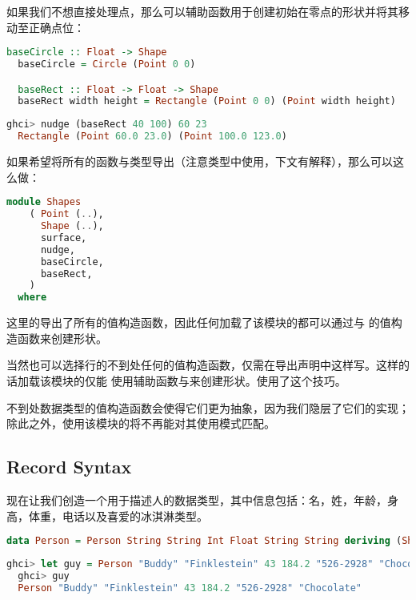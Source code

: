 \documentclass[./main.tex]{subfiles}
\begin{document}
如果我们不想直接处理点，那么可以辅助函数用于创建初始在零点的形状并将其移动至正确点位：

\begin{lstlisting}[language=Haskell]
  baseCircle :: Float -> Shape
  baseCircle = Circle (Point 0 0)

  baseRect :: Float -> Float -> Shape
  baseRect width height = Rectangle (Point 0 0) (Point width height)
\end{lstlisting}

\begin{lstlisting}[language=Haskell]
  ghci> nudge (baseRect 40 100) 60 23
  Rectangle (Point 60.0 23.0) (Point 100.0 123.0)
\end{lstlisting}

如果希望将所有的函数与类型导出（注意类型中使用，下文有解释），那么可以这么做：

\begin{lstlisting}[language=Haskell]
  module Shapes
    ( Point (..),
      Shape (..),
      surface,
      nudge,
      baseCircle,
      baseRect,
    )
  where
\end{lstlisting}

这里的导出了所有的值构造函数，因此任何加载了该模块的都可以通过与
的值构造函数来创建形状。

当然也可以选择行的不到处任何的值构造函数，仅需在导出声明中这样写。这样的话加载该模块的仅能
使用辅助函数与来创建形状。使用了这个技巧。

不到处数据类型的值构造函数会使得它们更为抽象，因为我们隐层了它们的实现；除此之外，使用该模块的将不再能对其使用模式匹配。

\subsection*{Record Syntax}

现在让我们创造一个用于描述人的数据类型，其中信息包括：名，姓，年龄，身高，体重，电话以及喜爱的冰淇淋类型。

\begin{lstlisting}[language=Haskell]
  data Person = Person String String Int Float String String deriving (Show)
\end{lstlisting}

\begin{lstlisting}[language=Haskell]
  ghci> let guy = Person "Buddy" "Finklestein" 43 184.2 "526-2928" "Chocolate"
  ghci> guy
  Person "Buddy" "Finklestein" 43 184.2 "526-2928" "Chocolate"
\end{lstlisting}
\end{document}
